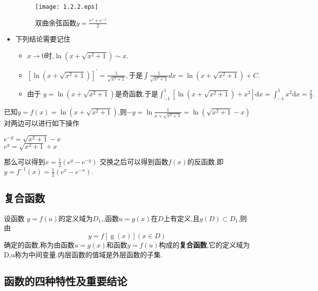\documentclass[12pt, a4paper, oneside, UTF8]{ctexbook}  %
\begin{document}
\begin{sloppypar}
\begin{note}
\begin{itemize}
\begin{figure}[H]
\begin{minipage}[t]{0.5\linewidth}
                          \texttt{[image: 1.2.2.eps]}
                          \caption{双曲余弦函数$y=\frac{e^x+e^{-x}}{2}$}
                      \end{minipage}
                  \end{figure}
            \item 下列结论需要记住
                  \begin{itemize}
                      \item $x\to0\text{时,}\ln\left(x+\sqrt{x^{2}+1}\right)\sim x.$
                      \item $\left[\ln\left(x+\sqrt{x^{2}+1}\right)\right]^{\prime}=\frac{1}{\sqrt{x^{2}+1}},\text{于是}\int\frac{1}{\sqrt{x^{2}+1}}dx=\ln\left(x+\sqrt{x^{2}+1}\right)+C.$
                      \item $\text{由于 }y=\ln\left(x+\sqrt{x^2+1}\right)\text{是奇函数,于是}\int_{-1}^1\left[\ln\left(x+\sqrt{x^2+1}\right)+x^2\right]\mathrm{d}x=\int_{-1}^1x^2\mathrm{d}x=\frac 23.$
                  \end{itemize}
        \end{itemize}
    \end{note}
    \begin{solution}
        已知$y=f(x)=\ln(x+\sqrt{x^2+1})$,则$-y=\ln \frac{1}{x+\sqrt{x^2+1}}=\ln(\sqrt{x^2+1}-x)$\\
        对两边可以进行如下操作
        \begin{center}
            $e^{-y}=\sqrt{x^2+1}-x$\\
            $e^{y}=\sqrt{x^2+1}+x$\\
        \end{center}
        那么可以得到$x=\frac{1}{2}(e^y-e^{-y})$
        交换之后可以得到函数$f(x)$的反函数,即
        $y=f^{-1}(x)=\frac{1}{2}(e^x-e^{-x})$.
    \end{solution}
    \subsection{复合函数}
    设函数 $y=f(u)$的定义域为$D_1$,,函数$u=g(x)$在$D$上有定义,且$g(D) \subset D_1$,则由
    $$
        y=f[\operatorname{g}(x)](x{\in}D)
    $$
    确定的函数,称为由函数$u=g(x)$和函数$y=f(u)$构成的\textbf{复合函数},它的定义域为D,u称为中间变量.内层函数的值域是外层函数的子集.
    \subsection{函数的四种特性及重要结论}

\end{sloppypar}
\end{document}
